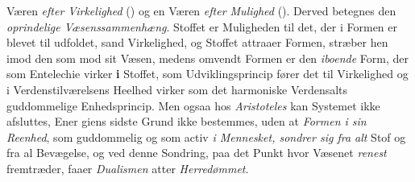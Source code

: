Væren \emph{efter Virkelighed} () og en Væren \emph{efter
Mulighed} (). Derved betegnes den \emph{oprindelige
Væsenssammenhæng}. Stoffet er Muligheden til det, der
i Formen er blevet til udfoldet, sand Virkelighed, og Stoffet
attraaer Formen, stræber hen imod den som mod sit Væsen,
medens omvendt Formen er den \emph{iboende} Form, der som
Entelechie virker \textbf{i} Stoffet, som Udviklingsprincip fører det til
Virkelighed og i Verdenstilværelsens Heelhed virker som det
harmoniske Verdensalts guddommelige Enhedsprincip. Men
ogsaa hos \emph{Aristoteles} kan Systemet ikke afsluttes, Ener\-%
giens sidste Grund ikke bestemmes, uden at \emph{Formen i sin
Reenhed}, som guddommelig  og som activ  \emph{i
Mennesket, sondrer sig fra alt} Stof og fra al Bevægelse,
og ved denne Sondring, paa det Punkt hvor Væsenet \emph{renest}
fremtræder, faaer \emph{Dualismen} atter \emph{Herredømmet}.

